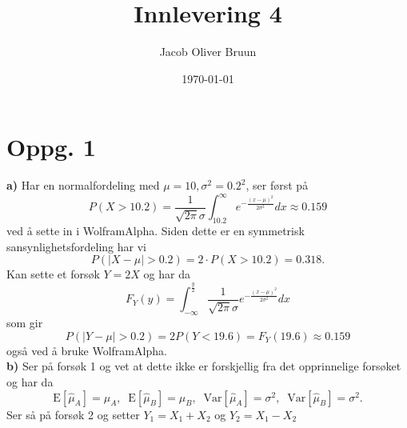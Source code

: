 \documentclass{report}
\title{Innlevering 4}
\author{Jacob Oliver Bruun}
\date{\today}
\newcommand{\nbrack}[1]{\left( #1 \right)}
\newcommand{\bbrack}[1]{\left[ #1 \right]}
\newcommand{\Var}[1]{\text{Var} \bbrack{ #1 }}
\newcommand{\std}[1]{\text{E} \bbrack{ #1 }}
\begin{document}
\section*{Oppg. 1}
\textbf{a)}
Har en normalfordeling med $\mu = 10, \sigma^{2} = 0.2^{2}$, ser først på
\begin{equation}
  \label{eq:1}
  P(X > 10.2) = \frac{1}{\sqrt{2\pi}\sigma} \int_{10.2}^{\infty} e^{-\frac{\nbrack{ x - \mu }^{2}}{2\sigma^{2}}} dx \approx 0.159
\end{equation}
ved å sette in i WolframAlpha. Siden dette er en symmetrisk sansynlighetsfordeling har vi
\begin{equation}
  \label{eq:2}
  P\nbrack{ |X - \mu| > 0.2} = 2\cdot P(X > 10.2) = 0.318.
\end{equation}
Kan sette et forsøk $Y = 2X$ og har da
\begin{equation}
  \label{eq:3}
  F_{Y}(y) = \int_{-\infty}^{\frac{y}{2}} \frac{1}{\sqrt{2\pi}\sigma} e^{-\frac{\nbrack{ x - \mu }^{2}}{2\sigma^{2}}} dx
\end{equation}
som gir
\begin{equation}
  \label{eq:4}
  P(|Y-\mu | > 0.2) = 2 P(Y < 19.6) = F_{Y}(19.6) \approx 0.159
\end{equation}
også ved å bruke WolframAlpha. \\

\textbf{b)}
Ser på forsøk 1 og vet at dette ikke er forskjellig fra det opprinnelige forsøket og har da
\begin{equation}
  \label{eq:5}
  \std{ \hat{\mu}_{A}} = \mu_{A}, \;\; \std{\hat{\mu}_{B}} = \mu_{B}, \;\; \Var{\hat{\mu}_{A}} = \sigma^{2}, \;\; \Var{\hat{\mu}_{B}} = \sigma^{2}.
\end{equation}
Ser så på forsøk 2 og setter $Y_{1} = X_{1} + X_{2}$ og $Y_{2} = X_{1} - X_{2}$
\end{document}
